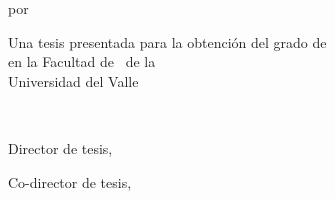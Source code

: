 \maketitle

\thispagestyle{empty}
\longvertspacing{}
\begin{tightcenter}
  por
\end{tightcenter}
\mylinespacing{}
\begin{tightcenter}
  \myname{}
\end{tightcenter}
\longvertspacing{}
\begin{tightcenter}
  Una tesis presentada para la obtención del grado de \degreetype\\
  en la Facultad de  \myprogram~de la  \\
  Universidad del Valle
\end{tightcenter}
\mylinespacing{}
\begin{tightcenter}
  \mymonth~\myyear{}
\end{tightcenter}
\mylinespacing{}
\begin{tightcenter}
  Director de tesis, \myadvisor{}
\end{tightcenter}
\begin{tightcenter}
  Co-director de tesis, \committeememberA{}
\end{tightcenter}
